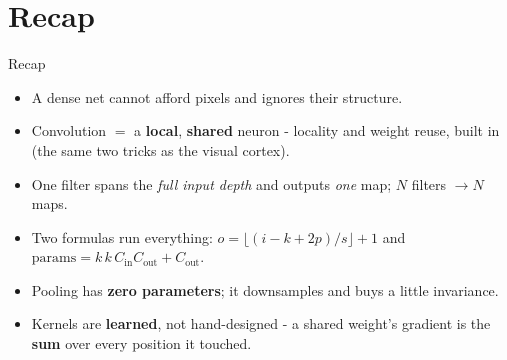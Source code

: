 \documentclass[aspectratio=169]{beamer}
\begin{document}
\section*{Recap}

\begin{frame}{Recap}
  \begin{itemize}
    \item A dense net cannot afford pixels and ignores their structure.
    \item Convolution $=$ a \textbf{local}, \textbf{shared} neuron - locality and weight
      reuse, built in (the same two tricks as the visual cortex).
    \item One filter spans the \emph{full input depth} and outputs \emph{one} map;
      $N$ filters $\to N$ maps.
    \item Two formulas run everything: $o=\lfloor(i-k+2p)/s\rfloor+1$ and
      $\text{params}=k\,k\,C_{\text{in}}C_{\text{out}}+C_{\text{out}}$.
    \item Pooling has \textbf{zero parameters}; it downsamples and buys a little invariance.
    \item Kernels are \textbf{learned}, not hand-designed - a shared weight's gradient is
      the \textbf{sum} over every position it touched.
  \end{itemize}
  \vskip 6pt
\end{frame}
\end{document}
